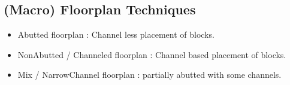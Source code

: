 \documentclass[letterpaper,10pt,english]{sphinxmanual}
\begin{document}
\subsection{(Macro) Floorplan Techniques}
\label{\detokenize{chapter5/_u5e03_u5c40Macro:macro-floorplan-techniques}}
\begin{figure}[htbp]
\centering

\noindent{}
\end{figure}
\begin{itemize}
\item {} 
\sphinxAtStartPar
Abutted floorplan : Channel less placement of blocks.

\item {} 
\sphinxAtStartPar
Non\sphinxhyphen{}Abutted / Channeled floorplan  : Channel based placement of blocks.

\item {} 
\sphinxAtStartPar
Mix / Narrow\sphinxhyphen{}Channel floorplan : partially abutted with some channels.

\end{itemize}
\end{document}
